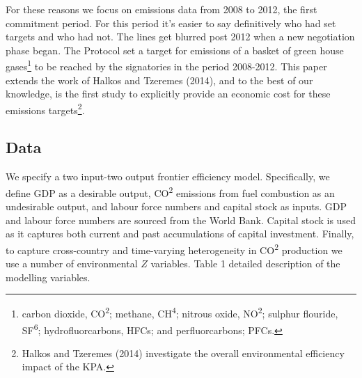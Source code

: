 \documentclass[
  10pt,
]{article}
\begin{document}
For these reasons we focus on emissions data from 2008 to 2012, the
first commitment period. For this period it's easier to say definitively
who had set targets and who had not. The lines get blurred post 2012
when a new negotiation phase began. The Protocol set a target for
emissions of a basket of green house gases\footnote{carbon dioxide,
  CO\textsuperscript{2}; methane, CH\textsuperscript{4}; nitrous oxide,
  NO\textsuperscript{2}; sulphur flouride, SF\textsuperscript{6};
  hydrofluorcarbons, HFCs; and perfluorcarbons; PFCs.} to be reached by
the signatories in the period 2008-2012. This paper extends the work of
Halkos and Tzeremes (2014), and to the best of our knowledge, is the
first study to explicitly provide an economic cost for these emissions
targets\footnote{Halkos and Tzeremes (2014) investigate the overall
  environmental efficiency impact of the KPA.}.

\hypertarget{data}{%
\subsection{Data}\label{data}}

We specify a two input-two output frontier efficiency model.
Specifically, we define GDP as a desirable output, CO\textsuperscript{2}
emissions from fuel combustion as an undesirable output, and labour
force numbers and capital stock as inputs. GDP and labour force numbers
are sourced from the World Bank. Capital stock is used as it captures
both current and past accumulations of capital investment. Finally, to
capture cross-country and time-varying heterogeneity in
CO\textsuperscript{2} production we use a number of environmental \(Z\)
variables. Table 1 detailed description of the modelling variables.

\begingroup\fontsize{8}{10}\selectfont
\end{document}
